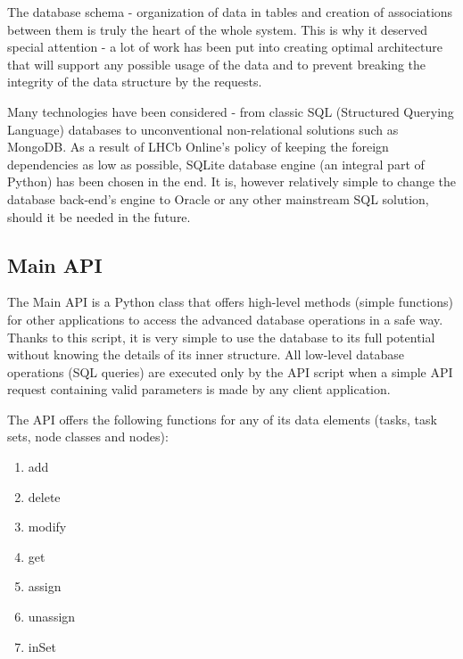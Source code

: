 \documentclass{customization}
\begin{document}
The database schema - organization of data in tables and creation of associations between them is truly the heart of the whole system. This is why it deserved special attention - a lot of work has been put into creating optimal architecture that will support any possible usage of the data and to prevent breaking the integrity of the data structure by the requests.
\newline

\noindent
Many technologies have been considered - from classic SQL (Structured Querying Language) databases to unconventional non-relational solutions such as MongoDB. As a result of LHCb Online's policy of keeping the foreign dependencies as low as possible, SQLite database engine (an integral part of Python) has been chosen in the end. It is, however relatively simple to change the database back-end's engine to Oracle or any other mainstream SQL solution, should it be needed in the future.


\subsection{Main API}
\hspace{0.6cm}

The Main API is a Python class that offers high-level methods (simple functions) for other applications to access the advanced database operations in a safe way. Thanks to this script, it is very simple to use the database to its full potential without knowing the details of its inner structure. All low-level database operations (SQL queries) are executed only by the API script when a simple API request containing valid parameters is made by any client application.
\newline

\noindent
The API offers the following functions for any of its data elements (tasks, task sets, node classes and nodes):

\begin{multicols}{2}
    \begin{enumerate}
        \item add
        \item delete
        \item modify
        \item get
        \item assign
        \item unassign
        \item inSet
    \end{enumerate}
\end{multicols}
\end{document}

